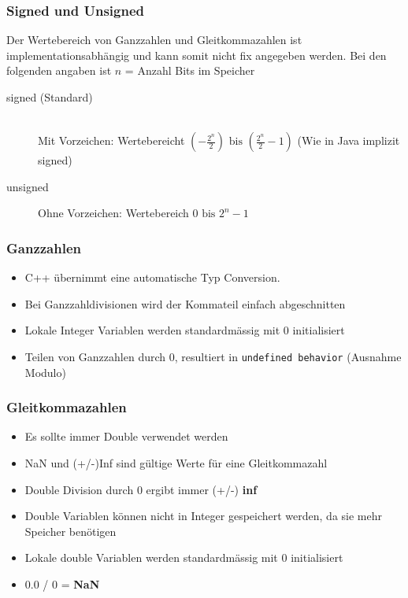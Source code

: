 \subsubsection{Signed und Unsigned}
Der Wertebereich von Ganzzahlen und Gleitkommazahlen ist implementationsabhängig und kann somit nicht fix angegeben werden. Bei den folgenden angaben ist $n$ = Anzahl Bits im Speicher
\begin{description}
	\item[signed (Standard)] \hfill \\
	Mit Vorzeichen: Wertebereicht $(-\frac{2^n}{2}) \text{ bis } (\frac{2^n}{2} - 1)$ (Wie in Java implizit signed)
	\item[unsigned] Ohne Vorzeichen: Wertebereich $0 \text{ bis } 2^n -1$
\end{description}

\subsubsection{Ganzzahlen}
\begin{itemize}
	\item C++ übernimmt eine automatische Typ Conversion.
	\item Bei Ganzzahldivisionen wird der Kommateil einfach abgeschnitten
	\item Lokale Integer Variablen werden standardmässig mit 0 initialisiert
	\item Teilen von Ganzzahlen durch 0, resultiert in \lstinline|undefined behavior| (Ausnahme Modulo)
\end{itemize}

\subsubsection{Gleitkommazahlen}
\begin{itemize}
	\item Es sollte immer Double verwendet werden
	\item NaN und (+/-)Inf sind gültige Werte für eine Gleitkommazahl
	\item Double Division durch 0 ergibt immer (+/-) \textbf{inf} 
	\item Double Variablen können nicht in Integer gespeichert werden, da sie mehr Speicher benötigen
	\item Lokale double Variablen werden standardmässig mit 0 initialisiert
	\item 0.0 / 0 = \textbf{NaN} 
\end{itemize}

